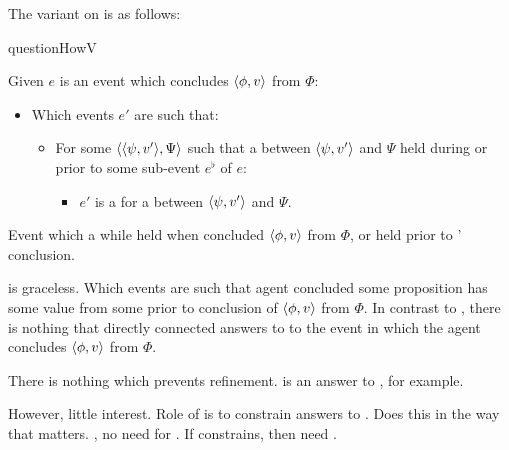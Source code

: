 \begin{note}
  The variant on \qHow{} is as follows:

  \begin{question}{questionHowV}{\qHowV{}}
    \label{q:how:v}
    \medskip

    Given \(e\) is an event which \vAgent{} concludes \(\langle \phi, v \rangle\) from \(\Phi\):
    \begin{itemize}
    \item
      Which events \(e'\) are such that:
      \begin{itemize}
      \item
        For some \(\langle \langle \psi, v' \rangle, \Psi \rangle\) such that a \ros{} between \(\langle \psi, v' \rangle\) and \(\Psi\) held during or prior to some sub-event \(e^{\flat}\) of \(e\):
        \begin{itemize}
        \item
          \(e'\) is a  for a \ros{} between \(\langle \psi, v' \rangle\) and \(\Psi\).
        \end{itemize}
      \end{itemize}
    \end{itemize}
    \vspace{-\baselineskip}
  \end{question}

  Event which \wit{} a \ros{} while held when \vAgent{} concluded \(\langle \phi, v \rangle\) from \(\Phi\), or held prior to \vAgent{}' conclusion.
\end{note}

\begin{note}
  \qHowV{} is graceless.
  Which events are such that agent concluded some proposition has some value from some \pool{} prior to conclusion of \(\langle \phi, v \rangle\) from \(\Phi\).
  In contrast to \qHow{}, there is nothing that directly connected answers to \qHowV{} to the event in which the agent concludes \(\langle \phi, v \rangle\) from \(\Phi\).

  There is nothing which prevents refinement.
  \ros{} is an answer to \qWhyV{}, for example.

  However, little interest.
  Role of \qHowV{} is to constrain answers to \qWhyV{}.
  Does this in the way that matters.
  \supportII{}, no need for \wit{}.
  If constrains, then need \wit{}.
\end{note}

